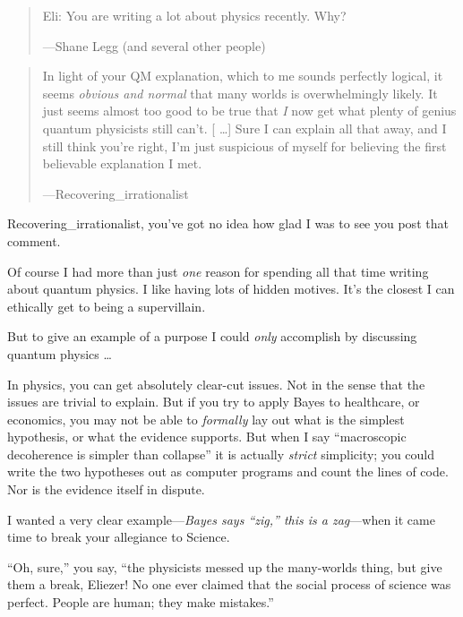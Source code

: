\begin{quote}
{
 Eli: You are writing a lot about physics recently. Why?}

{\raggedleft
 {}---Shane Legg (and several other people)
\par}
\end{quote}

\begin{quote}
{
 In light of your QM explanation, which to me sounds perfectly
logical, it seems \textit{obvious and normal} that many worlds is
overwhelmingly likely. It just seems almost too good to be true that
\textit{I} now get what plenty of genius quantum physicists still
can't. [ \ldots ] Sure I can explain all that away, and
I still think you're right, I'm just
suspicious of myself for believing the first believable explanation I
met.}

{\raggedleft
 {}---Recovering\_irrationalist
\par}
\end{quote}

{
 Recovering\_irrationalist, you've got no idea how
glad I was to see you post that comment.}

{
 Of course I had more than just \textit{one} reason for spending
all that time writing about quantum physics. I like having lots of
hidden motives. It's the closest I can ethically get to
being a supervillain.}

{
 But to give an example of a purpose I could \textit{only}
accomplish by discussing quantum physics \ldots}

{
 In physics, you can get absolutely clear-cut issues. Not in the
sense that the issues are trivial to explain. But if you try to apply
Bayes to healthcare, or economics, you may not be able to
\textit{formally} lay out what is the simplest hypothesis, or what the
evidence supports. But when I say ``macroscopic
decoherence is simpler than collapse'' it is actually
\textit{strict} simplicity; you could write the two hypotheses out as
computer programs and count the lines of code. Nor is the evidence
itself in dispute.}

{
 I wanted a very clear example---\textit{Bayes says
``zig,'' this is a zag}{}---when it
came time to break your allegiance to Science.}

{
 ``Oh, sure,'' you say,
``the physicists messed up the many-worlds thing, but
give them a break, Eliezer! No one ever claimed that the social process
of science was perfect. People are human; they make
mistakes.''}

